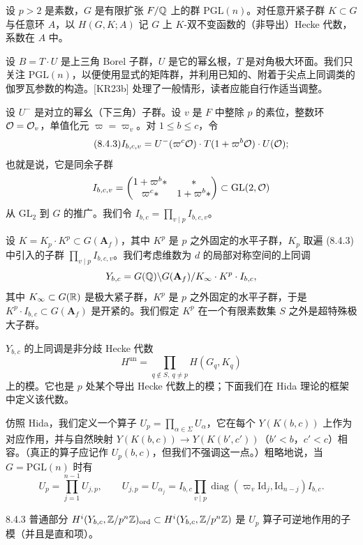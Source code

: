 设 $p>2$ 是素数，$G$ 是有限扩张 $F/\mathbb{Q}$ 上的群 $\mathrm{PGL}(n)$。对任意开紧子群 $K\subset G$ 与任意环 $A$，以 $H(G,K;A)$ 记 $G$ 上 $K$-双不变函数的（非导出）Hecke 代数，系数在 $A$ 中。

设 $B=T\cdot U$ 是上三角 Borel 子群，$U$ 是它的幂幺根，$T$ 是对角极大环面。我们只关注 $\mathrm{PGL}(n)$，以便使用显式的矩阵群，并利用已知的、附着于尖点上同调类的伽罗瓦参数的构造。[KR23b] 处理了一般情形，读者应能自行作适当调整。

设 $U^-$ 是对立的幂幺（下三角）子群。设 $v$ 是 $F$ 中整除 $p$ 的素位，整数环 $\mathcal{O}=\mathcal{O}_v$，单值化元 $\varpi=\varpi_v$。对 $1\le b\le c$，令
\begin{equation}\tag{8.4.3}\label{eq:a6-06-2}
I_{b,c,v}=U^-(\varpi^c\mathcal{O})\cdot T(1+\varpi^b\mathcal{O})\cdot U(\mathcal{O});
\end{equation}
也就是说，它是同余子群
\[
I_{b,c,v}=\begin{pmatrix}1+\varpi^b*&*\\ \varpi^c*&1+\varpi^b*\end{pmatrix}\subset\mathrm{GL}(2,\mathcal{O})
\]
从 $\mathrm{GL}_2$ 到 $G$ 的推广。我们令 $I_{b,c}=\prod_{v\mid p}I_{b,c,v}$。

设 $K=K_p\cdot K^p\subset G(\mathbf A_f)$，其中 $K^p$ 是 $p$ 之外固定的水平子群，$K_p$ 取遍 (8.4.3) 中引入的子群 $\prod_{v\mid p}I_{b,c,v}$。我们考虑维数为 $d$ 的局部对称空间的上同调
\[
Y_{b,c}=G(\mathbb{Q})\backslash G(\mathbf A_f)/K_\infty\cdot K^p\cdot I_{b,c},
\]
其中 $K_\infty\subset G(\mathbb{R})$ 是极大紧子群，$K^p$ 是 $p$ 之外固定的水平子群，于是 $K^p\cdot I_{b,c}\subset G(\mathbf A_f)$ 是开紧的。我们假定 $K^p$ 在一个有限素数集 $S$ 之外是超特殊极大子群。

$Y_{b,c}$ 的上同调是非分歧 Hecke 代数
\[
H^{\mathrm{un}}=\prod_{q\notin S,\ q\neq p}H(G_q,K_q)
\]
上的模。它也是 $p$ 处某个导出 Hecke 代数上的模；下面我们在 Hida 理论的框架中定义该代数。

仿照 Hida，我们定义一个算子 $U_p=\prod_{\alpha\in\Sigma}U_\alpha$，它在每个 $Y(K(b,c))$ 上作为对应作用，并与自然映射 $Y(K(b,c))\to Y(K(b',c'))$（$b'<b$，$c'<c$）相容。（真正的算子应记作 $U_p(b,c)$，但我们不强调这一点。）粗略地说，当 $G=\mathrm{PGL}(n)$ 时有
\[
U_p=\prod_{j=1}^{n-1}U_{j,p},\qquad U_{j,p}=U_{\alpha_j}=I_{b,c}\prod_{v\mid p}\operatorname{diag}(\varpi_v\mathrm{Id}_j,\mathrm{Id}_{n-j})I_{b,c}.
\]

\begin{defn}{8.4.3}\label{thm:a6-06-3}
普通部分 $H^i(Y_{b,c},\mathbb{Z}/p^n\mathbb{Z})_{\mathrm{ord}}\subset H^i(Y_{b,c},\mathbb{Z}/p^n\mathbb{Z})$ 是 $U_p$ 算子可逆地作用的子模（并且是直和项）。
\end{defn}

